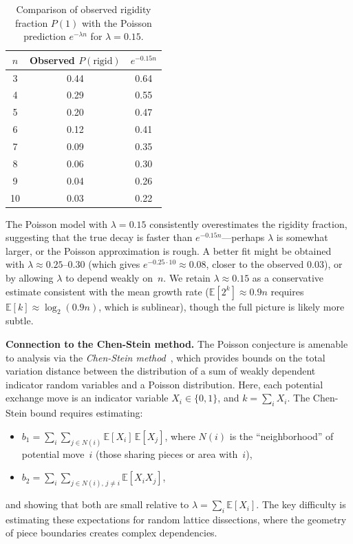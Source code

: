 \documentclass[12pt]{article}
\theoremstyle{definition}
\theoremstyle{remark}
\begin{document}
\begin{table}[ht]
\centering
\caption{Comparison of observed rigidity fraction $P(1)$ with the
  Poisson prediction $e^{-\lambda n}$ for $\lambda = 0.15$.}
\label{tab:poisson_fit}
\medskip
\begin{tabular}{@{}c c c@{}}
\toprule
$n$ & Observed $P(\text{rigid})$ & $e^{-0.15n}$ \\
\midrule
 3 & 0.44 & 0.64 \\
 4 & 0.29 & 0.55 \\
 5 & 0.20 & 0.47 \\
 6 & 0.12 & 0.41 \\
 7 & 0.09 & 0.35 \\
 8 & 0.06 & 0.30 \\
 9 & 0.04 & 0.26 \\
10 & 0.03 & 0.22 \\
\bottomrule
\end{tabular}
\end{table}

The Poisson model with $\lambda = 0.15$ consistently overestimates the
rigidity fraction, suggesting that the true decay is faster than
$e^{-0.15n}$---perhaps $\lambda$ is somewhat larger, or the Poisson
approximation is rough. A better fit might be obtained with
$\lambda \approx 0.25$--$0.30$ (which gives $e^{-0.25 \cdot 10}
\approx 0.08$, closer to the observed $0.03$), or by allowing $\lambda$
to depend weakly on~$n$. We retain $\lambda \approx 0.15$ as a
conservative estimate consistent with the mean growth rate
($\mathbb{E}[2^k] \approx 0.9n$ requires $\mathbb{E}[k] \approx
\log_2(0.9n)$, which is sublinear), though the full picture is likely
more subtle.

\textbf{Connection to the Chen-Stein method.}
The Poisson conjecture is amenable to analysis via the
\emph{Chen-Stein method}~\cite{ChenStein}, which provides bounds on the
total variation distance between the distribution of a sum of
weakly dependent indicator random variables and a Poisson distribution.
Here, each potential exchange move is an indicator variable
$X_i \in \{0, 1\}$, and $k = \sum_i X_i$. The Chen-Stein bound requires
estimating:
\begin{itemize}
  \item $b_1 = \sum_{i} \sum_{j \in N(i)} \mathbb{E}[X_i]\,
    \mathbb{E}[X_j]$, where $N(i)$ is the ``neighborhood'' of
    potential move~$i$ (those sharing pieces or area with~$i$),
  \item $b_2 = \sum_{i} \sum_{j \in N(i),\, j \neq i}
    \mathbb{E}[X_i X_j]$,
\end{itemize}
and showing that both are small relative to $\lambda = \sum_i
\mathbb{E}[X_i]$. The key difficulty is estimating these expectations
for random lattice dissections, where the geometry of piece boundaries
creates complex dependencies.
\end{document}
